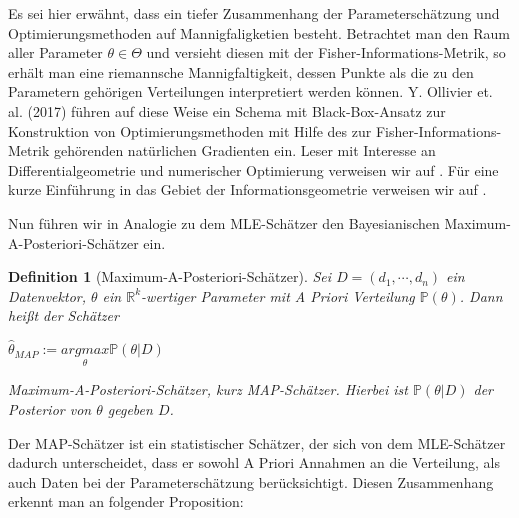 \documentclass{report}
\theoremstyle{linebreak}
\newtheorem{defi}{Definition}%
\begin{document}
Es sei hier erwähnt, dass ein tiefer Zusammenhang der Parameterschätzung und Optimierungsmethoden auf Mannigfaligketien besteht. Betrachtet man den Raum aller Parameter $\theta \in \Theta$ und versieht diesen mit der Fisher-Informations-Metrik, so erhält man eine riemannsche Mannigfaltigkeit, dessen Punkte als die zu den Parametern gehörigen Verteilungen interpretiert werden können. Y. Ollivier et. al. (2017) führen auf diese Weise ein Schema mit Black-Box-Ansatz zur Konstruktion von Optimierungsmethoden mit Hilfe des zur Fisher-Informations-Metrik gehörenden natürlichen Gradienten ein. Leser mit Interesse an Differentialgeometrie und numerischer Optimierung verweisen wir auf \cite{Info_Geom}. Für eine kurze Einführung in das Gebiet der Informationsgeometrie verweisen wir auf \cite{Info_Geom_intro}.

Nun führen wir in Analogie zu dem MLE-Schätzer den Bayesianischen Maximum-A-Posteriori-Schätzer ein.

\begin{defi}[Maximum-A-Posteriori-Schätzer]
	Sei $D = (d_1, \cdots, d_n)$ ein Datenvektor, $\theta$ ein $\mathbb{R}^k$-wertiger
	Parameter mit A Priori Verteilung $\mathbb{P}(\theta)$. Dann heißt der Schätzer
	\begin{center}
		$\hat{\theta}_{MAP} := \underset{\theta}{arg max} \mathbb{P}(\theta \vert 					D)$
	\end{center}
	\textit{Maximum-A-Posteriori-Schätzer}, kurz \textit{MAP-Schätzer}. Hierbei ist 
	$\mathbb{P}(\theta \vert D)$ der Posterior von $\theta$ gegeben $D$.
\end{defi}

Der MAP-Schätzer ist ein statistischer Schätzer, der sich von dem MLE-Schätzer dadurch unterscheidet, dass er sowohl A Priori Annahmen an die Verteilung, als auch Daten bei der Parameterschätzung berücksichtigt. Diesen Zusammenhang erkennt man an folgender Proposition:





\nocite{*}


\end{document}
